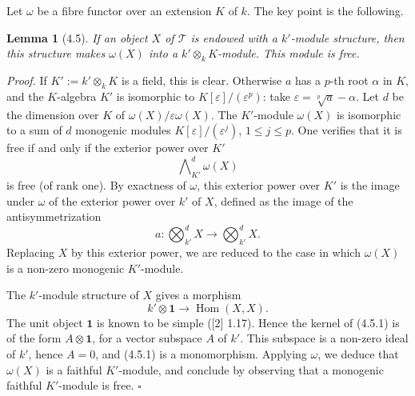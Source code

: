 \documentclass[10pt]{article}
\newcommand{\Hom}{\operatorname{Hom}}
\newcommand{\T}{\mathcal T}
\newcommand{\one}{\mathbf{1}}
\theoremstyle{deligne}
\newtheorem*{lemma*}{Lemma}
\newenvironment{proofdel}{\textit{Proof.}}{\hfill$\square$}
\newcommand{\heading}[1]{\vspace{0.7em}\noindent{\bfseries #1}\quad}
\begin{document}
\heading{Proof when \(k'=k(a^{1/p})\).}
Let \(\omega\) be a fibre functor over an extension \(K\) of \(k\). The key point is the following.

\begin{lemma*}[4.5]
If an object \(X\) of \(\T\) is endowed with a \(k'\)-module structure, then this structure makes \(\omega(X)\) into a \(k'\otimes_k K\)-module. This module is free.
\end{lemma*}

\begin{proofdel}
If \(K':=k'\otimes_k K\) is a field, this is clear. Otherwise \(a\) has a \(p\)-th root \(\alpha\) in \(K\), and the \(K\)-algebra \(K'\) is isomorphic to \(K[\varepsilon]/(\varepsilon^p)\): take \(\varepsilon=\sqrt[p]{a}-\alpha\). Let \(d\) be the dimension over \(K\) of \(\omega(X)/\varepsilon\omega(X)\). The \(K'\)-module \(\omega(X)\) is isomorphic to a sum of \(d\) monogenic modules \(K[\varepsilon]/(\varepsilon^j)\), \(1\le j\le p\). One verifies that it is free if and only if the exterior power over \(K'\)
\[
\bigwedge\nolimits^d_{K'}\omega(X)
\]
is free (of rank one). By exactness of \(\omega\), this exterior power over \(K'\) is the image under \(\omega\) of the exterior power over \(k'\) of \(X\), defined as the image of the antisymmetrization
\[
a:\bigotimes\nolimits^d_{k'}X\longrightarrow \bigotimes\nolimits^d_{k'}X.
\]
Replacing \(X\) by this exterior power, we are reduced to the case in which \(\omega(X)\) is a non-zero monogenic \(K'\)-module.

The \(k'\)-module structure of \(X\) gives a morphism
\[
\tag{4.5.1}
k'\otimes \one\longrightarrow \Hom(X,X).
\]
The unit object \(\one\) is known to be simple ([2] 1.17). Hence the kernel of (4.5.1) is of the form \(A\otimes\one\), for a vector subspace \(A\) of \(k'\). This subspace is a non-zero ideal of \(k'\), hence \(A=0\), and (4.5.1) is a monomorphism. Applying \(\omega\), we deduce that \(\omega(X)\) is a faithful \(K'\)-module, and conclude by observing that a monogenic faithful \(K'\)-module is free.
\end{proofdel}
\end{document}
